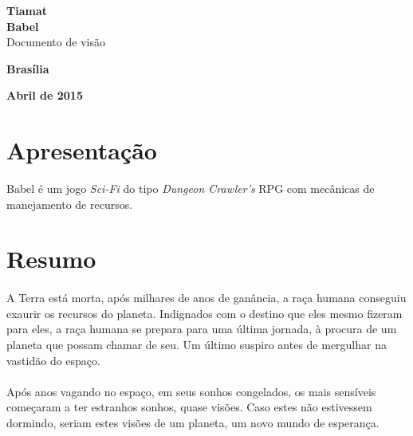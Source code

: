 \documentclass[11pt]{article} %
\begin{document}
\begin{titlepage}
 \vfill
  \begin{center}
   {\large \textbf{Tiamat}} \\
   {\large \textbf{Babel}}\\[6cm]


   {\Large Documento de visão}\\[6cm]

   \hspace{.45\textwidth} %
  \vfill

\vspace{2cm}

\large \textbf{Brasília}

\large \textbf{Abril de 2015}
\end{center}
\end{titlepage}
\newpage


\section*{Apresentação}

Babel é um jogo \textit{Sci-Fi} do tipo \textit{Dungeon Crawler's} RPG com mecânicas de manejamento de recursos.

\section*{Resumo}

\paragraph{}A Terra está morta, após milhares de anos de ganância, a raça humana conseguiu exaurir os recursos do planeta.  Indignados com o destino que eles mesmo fizeram para eles, a raça humana se prepara para uma última jornada, à procura de um planeta que possam chamar de seu. Um  último suspiro antes de mergulhar na vastidão do espaço.

\paragraph{}Após anos vagando no espaço, em seus sonhos congelados, os mais sensíveis começaram a ter estranhos sonhos, quase visões. Caso estes não estivessem dormindo, seriam estes visões de um planeta, um novo mundo de esperança.
\end{document}

